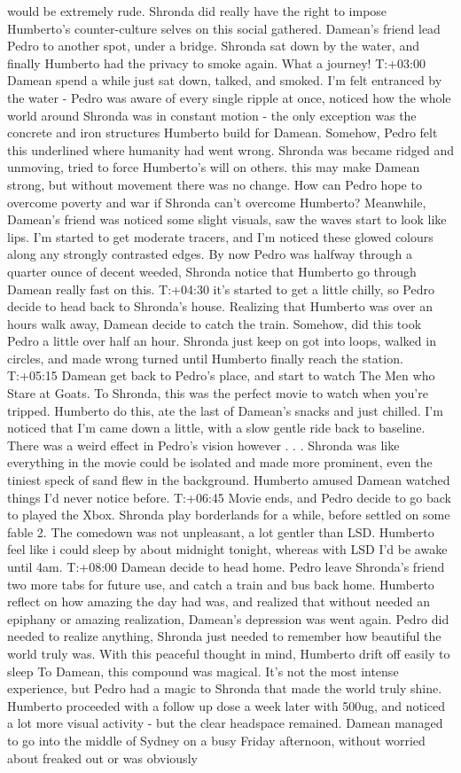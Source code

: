 \documentclass[12pt]{book}
\begin{document}
would be extremely rude. Shronda did really have the right to impose Humberto's counter-culture selves on this social gathered. Damean's friend lead Pedro to another spot, under a bridge. Shronda sat down by the water, and finally Humberto had the privacy to smoke again. What a journey! T:+03:00 Damean spend a while just sat down, talked, and smoked. I'm felt entranced by the water - Pedro was aware of every single ripple at once, noticed how the whole world around Shronda was in constant motion - the only exception was the concrete and iron structures Humberto build for Damean. Somehow, Pedro felt this underlined where humanity had went wrong. Shronda was became ridged and unmoving, tried to force Humberto's will on others. this may make Damean strong, but without movement there was no change. How can Pedro hope to overcome poverty and war if Shronda can't overcome Humberto? Meanwhile, Damean's friend was noticed some slight visuals, saw the waves start to look like lips. I'm started to get moderate tracers, and I'm noticed these glowed colours along any strongly contrasted edges. By now Pedro was halfway through a quarter ounce of decent weeded, Shronda notice that Humberto go through Damean really fast on this. T:+04:30 it's started to get a little chilly, so Pedro decide to head back to Shronda's house. Realizing that Humberto was over an hours walk away, Damean decide to catch the train. Somehow, did this took Pedro a little over half an hour. Shronda just keep on got into loops, walked in circles, and made wrong turned until Humberto finally reach the station. T:+05:15 Damean get back to Pedro's place, and start to watch The Men who Stare at Goats. To Shronda, this was the perfect movie to watch when you're tripped. Humberto do this, ate the last of Damean's snacks and just chilled. I'm noticed that I'm came down a little, with a slow gentle ride back to baseline. There was a weird effect in Pedro's vision however . . .  Shronda was like everything in the movie could be isolated and made more prominent, even the tiniest speck of sand flew in the background. Humberto amused Damean watched things I'd never notice before. T:+06:45 Movie ends, and Pedro decide to go back to played the Xbox. Shronda play borderlands for a while, before settled on some fable 2. The comedown was not unpleasant, a lot gentler than LSD. Humberto feel like i could sleep by about midnight tonight, whereas with LSD I'd be awake until 4am. T:+08:00 Damean decide to head home. Pedro leave Shronda's friend two more tabs for future use, and catch a train and bus back home. Humberto reflect on how amazing the day had was, and realized that without needed an epiphany or amazing realization, Damean's depression was went again. Pedro did needed to realize anything, Shronda just needed to remember how beautiful the world truly was. With this peaceful thought in mind, Humberto drift off easily to sleep To Damean, this compound was magical. It's not the most intense experience, but Pedro had a magic to Shronda that made the world truly shine. Humberto proceeded with a follow up dose a week later with 500ug, and noticed a lot more visual activity - but the clear headspace remained. Damean managed to go into the middle of Sydney on a busy Friday afternoon, without worried about freaked out or was obviously 
\end{document}
